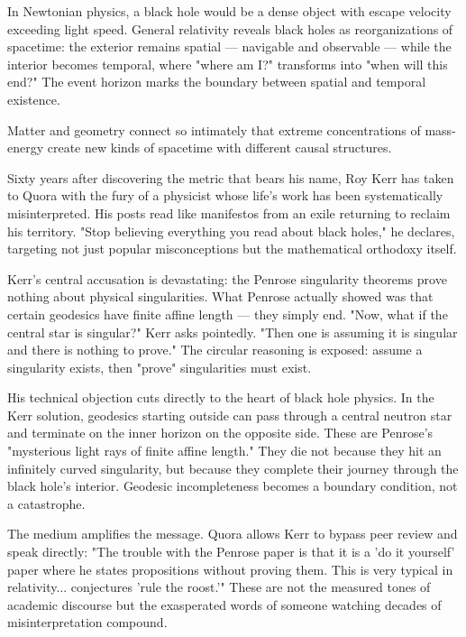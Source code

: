 In Newtonian physics, a black hole would be a dense object with escape velocity exceeding light speed. General relativity reveals black holes as reorganizations of spacetime: the exterior remains spatial — navigable and observable — while the interior becomes temporal, where "where am I?" transforms into "when will this end?" The event horizon marks the boundary between spatial and temporal existence.

Matter and geometry connect so intimately that extreme concentrations of mass-energy create new kinds of spacetime with different causal structures.

\newpage

\begin{commentary}
Sixty years after discovering the metric that bears his name, Roy Kerr has taken to Quora with the fury of a physicist whose life's work has been systematically misinterpreted. His posts read like manifestos from an exile returning to reclaim his territory. "Stop believing everything you read about black holes," he declares, targeting not just popular misconceptions but the mathematical orthodoxy itself.

Kerr's central accusation is devastating: the Penrose singularity theorems prove nothing about physical singularities. What Penrose actually showed was that certain geodesics have finite affine length — they simply end. "Now, what if the central star is singular?" Kerr asks pointedly. "Then one is assuming it is singular and there is nothing to prove." The circular reasoning is exposed: assume a singularity exists, then "prove" singularities must exist.

His technical objection cuts directly to the heart of black hole physics. In the Kerr solution, geodesics starting outside can pass through a central neutron star and terminate on the inner horizon on the opposite side. These are Penrose's "mysterious light rays of finite affine length." They die not because they hit an infinitely curved singularity, but because they complete their journey through the black hole's interior. Geodesic incompleteness becomes a boundary condition, not a catastrophe.

The medium amplifies the message. Quora allows Kerr to bypass peer review and speak directly: "The trouble with the Penrose paper is that it is a 'do it yourself' paper where he states propositions without proving them. This is very typical in relativity... conjectures 'rule the roost.'" These are not the measured tones of academic discourse but the exasperated words of someone watching decades of misinterpretation compound.


\end{commentary}
